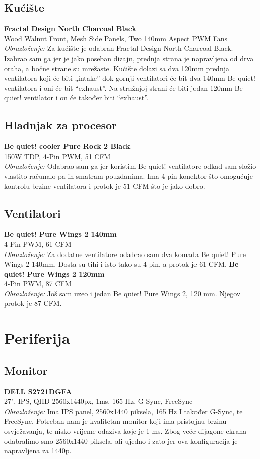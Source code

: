 \documentclass{article}
\begin{document}
\subsection*{Kućište}
\textbf{Fractal Design North Charcoal Black} \\
Wood Walnut Front, Mesh Side Panels, Two 140mm Aspect PWM Fans \\
\textit{Obrazloženje:} Za kućište je odabran Fractal Design North Charcoal Black. Izabrao sam ga jer je jako poseban dizajn, prednja strana je napravljena od drva oraha, a bočne strane su mrežaste. Kućište dolazi sa dva 120mm prednja ventilatora koji će biti „intake” dok gornji ventilatori će bit dva 140mm Be quiet! ventilatora i oni će bit “exhaust”. Na stražnjoj strani će biti jedan 120mm Be quiet! ventilator i on će također biti “exhaust”.

\subsection*{Hladnjak za procesor}
\textbf{Be quiet! cooler Pure Rock 2 Black} \\
150W TDP, 4-Pin PWM, 51 CFM \\
\textit{Obrazloženje:} Odabrao sam ga jer koristim Be quiet! ventilatore odkad sam složio vlastito računalo pa ih smatram pouzdanima. Ima 4-pin konektor što omogućuje kontrolu brzine ventilatora i protok je 51 CFM što je jako dobro.

\subsection*{Ventilatori}
\textbf{Be quiet! Pure Wings 2 140mm} \\
4-Pin PWM, 61 CFM \\
\textit{Obrazloženje:} Za dodatne ventilatore odabrao sam dva komada Be quiet! Pure Wings 2 140mm. Dosta su tihi i isto tako su 4-pin, a protok je 61 CFM.
\textbf{Be quiet! Pure Wings 2 120mm} \\
4-Pin PWM, 87 CFM \\
\textit{Obrazloženje:} Još sam uzeo i jedan Be quiet! Pure Wings 2, 120 mm. Njegov protok je 87 CFM.

\section*{Periferija}

\subsection*{Monitor}
\textbf{DELL S2721DGFA} \\
27", IPS, QHD 2560x1440px, 1ms, 165 Hz, G-Sync, FreeSync \\
\textit{Obrazloženje:} Ima IPS panel, 2560x1440 piksela, 165 Hz I također G-Sync, te FreeSync. Potreban nam je kvalitetan monitor koji ima pristojnu brzinu osvježavanja, te nisko vrijeme odaziva koje je 1 ms. Zbog veće dijagone ekrana odabralimo smo 2560x1440 piksela, ali ujedno i zato jer ova konfiguracija je napravljena za 1440p.
\end{document}
